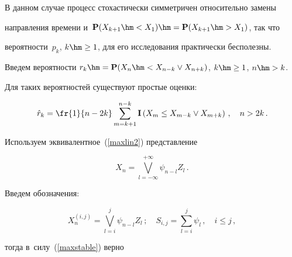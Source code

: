В данном случае процесс стохастически симметричен относительно замены


направления времени и~${\bf P}(X_{k+1}\hm<X_1)\hm={\bf P}(X_{k+1}\hm>X_1)$, так что


вероятности~$p_k$, $k\hm\ge 1$, для его исследования практически бесполезны.





Введем вероятности $r_k\hm={\bf P}(X_n\hm<X_{n-k}\vee X_{n+k})$, $k\hm\ge 1$, $n\hm>k$.


Для таких вероятностей существуют простые оценки:





\noindent


\begin{equation}\label{rk}


{\hat r}_k=\fr{1}{n-2k}\sum\limits_{m=k+1}^{n-k}{\bf I}


\left(X_m\le X_{m-k}\vee X_{m+k}\right)\,,


\quad n>2k\,.


\end{equation}





Используем эквивалентное~(\ref{maxlin2}) представление





\noindent


\begin{equation}\label{razl}


X_n=\bigvee_{l=-\infty}^{+\infty}\psi_{n-l}Z_l\,.


\end{equation}





Введем обозначения:





\noindent


$$


X_n^{(i,j)}=\bigvee_{l=i}^j\psi_{n-l}Z_l\,;\quad 


S_{i,j}=\sum\limits_{l=i}^j\psi_l\,,\quad 


i\le j\,,


$$


тогда в~силу~(\ref{maxstable}) верно






